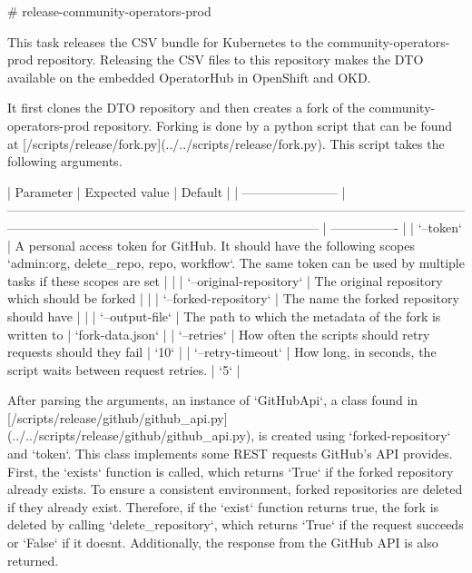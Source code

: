 # release-community-operators-prod

This task releases the CSV bundle for Kubernetes to the community-operators-prod repository.
Releasing the CSV files to this repository makes the DTO available on the embedded OperatorHub in OpenShift and OKD.

It first clones the DTO repository and then creates a fork of the community-operators-prod repository.
Forking is done by a python script that can be found at [/scripts/release/fork.py](../../scripts/release/fork.py).
This script takes the following arguments.

| Parameter               | Expected value                                                                                                                                                                         | Default          |
| ----------------------- | -------------------------------------------------------------------------------------------------------------------------------------------------------------------------------------- | ---------------- |
| `--token`               | A personal access token for GitHub. It should have the following scopes `admin:org, delete_repo, repo, workflow`. The same token can be used by multiple tasks if these scopes are set |                  |
| `--original-repository` | The original repository which should be forked                                                                                                                                         |                  |
| `--forked-repository`   | The name the forked repository should have                                                                                                                                             |                  |
| `--output-file`         | The path to which the metadata of the fork is written to                                                                                                                               | `fork-data.json` |
| `--retries`             | How often the scripts should retry requests should they fail                                                                                                                           | `10`             |
| `--retry-timeout`       | How long, in seconds, the script waits between request retries.                                                                                                                        | `5`              |

After parsing the arguments, an instance of `GitHubApi`, a class found in [/scripts/release/github/github_api.py](../../scripts/release/github/github_api.py), is created using `{forked-repository}` and `{token}`.
This class implements some REST requests GitHub's API provides.
First, the `exists` function is called, which returns `True` if the forked repository already exists.
To ensure a consistent environment, forked repositories are deleted if they already exist.
Therefore, if the `exist` function returns true, the fork is deleted by calling `delete_repository`, which returns `True` if the request succeeds or `False` if it doesnt.
Additionally, the response from the GitHub API is also returned.

